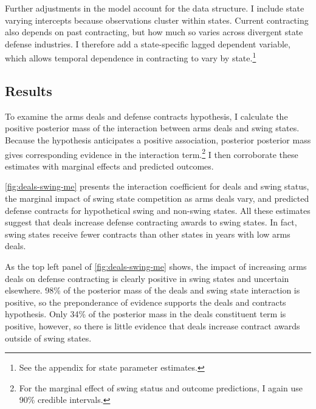 \documentclass[12pt]{article}
\begin{document}
Further adjustments in the model account for the data structure.
I include state varying intercepts because observations cluster within states. 
Current contracting also depends on past contracting, but how much so varies across divergent state defense industries. 
I therefore add a state-specific lagged dependent variable, which allows temporal dependence in contracting to vary by state.\footnote{See the appendix for state parameter estimates.}


\subsection{Results}


To examine the arms deals and defense contracts hypothesis, I calculate the positive posterior mass of the interaction between arms deals and swing states. Because the hypothesis anticipates a positive association, posterior posterior mass gives corresponding evidence in the interaction term.\footnote{For the marginal effect of swing status and outcome predictions, I again use 90\% credible intervals.}
I then corroborate these estimates with marginal effects and predicted outcomes.


\autoref{fig:deals-swing-me} presents the interaction coefficient for deals and swing status, the marginal impact of swing state competition as arms deals vary, and predicted defense contracts for hypothetical swing and non-swing states. 
All these estimates suggest that deals increase defense contracting awards to swing states. 
In fact, swing states receive fewer contracts than other states in years with low arms deals. 


As the top left panel of \autoref{fig:deals-swing-me} shows, the impact of increasing arms deals on defense contracting is clearly positive in swing states and uncertain elsewhere.
98\% of the posterior mass of the deals and swing state interaction is positive, so the preponderance of evidence supports the deals and contracts hypothesis.
Only 34\% of the posterior mass in the deals constituent term is positive, however, so there is little evidence that deals increase contract awards outside of swing states. 
\end{document}
